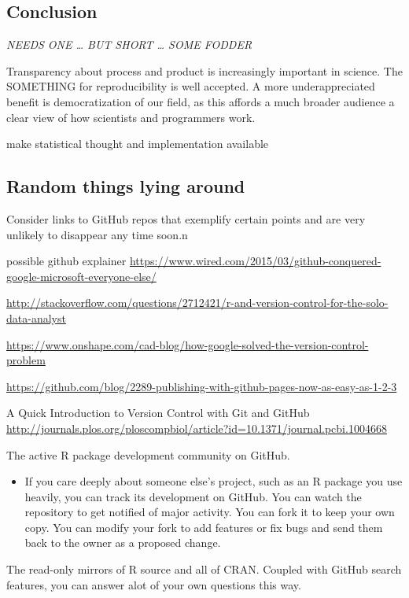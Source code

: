 \documentclass[12pt]{article}
\providecommand{\tightlist}{%
  \setlength{\itemsep}{0pt}\setlength{\parskip}{0pt}}
\begin{document}
\subsection{Conclusion}\label{conclusion}

\emph{NEEDS ONE \ldots{} BUT SHORT \ldots{} SOME FODDER}

Transparency about process and product is increasingly important in
science. The SOMETHING for reproducibility is well accepted. A more
underappreciated benefit is democratization of our field, as this
affords a much broader audience a clear view of how scientists and
programmers work.

make statistical thought and implementation available

\subsection{Random things lying
around}\label{random-things-lying-around}

Consider links to GitHub repos that exemplify certain points and are
very unlikely to disappear any time soon.n

possible github explainer
\url{https://www.wired.com/2015/03/github-conquered-google-microsoft-everyone-else/}

\url{http://stackoverflow.com/questions/2712421/r-and-version-control-for-the-solo-data-analyst}

\url{https://www.onshape.com/cad-blog/how-google-solved-the-version-control-problem}

\url{https://github.com/blog/2289-publishing-with-github-pages-now-as-easy-as-1-2-3}

A Quick Introduction to Version Control with Git and GitHub
\url{http://journals.plos.org/ploscompbiol/article?id=10.1371/journal.pcbi.1004668}

The active R package development community on GitHub.

\begin{itemize}
\tightlist
\item
  If you care deeply about someone else's project, such as an R package
  you use heavily, you can track its development on GitHub. You can
  watch the repository to get notified of major activity. You can fork
  it to keep your own copy. You can modify your fork to add features or
  fix bugs and send them back to the owner as a proposed change.
\end{itemize}

The read-only mirrors of R source and all of CRAN. Coupled with GitHub
search features, you can answer alot of your own questions this way.



\end{document}
